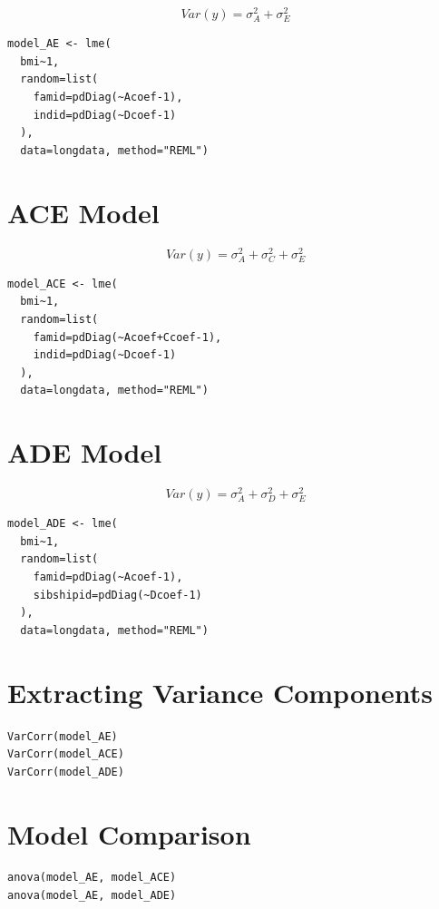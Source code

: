 \documentclass[12pt]{article}
\begin{document}
\[
Var(y)=\sigma_A^2+\sigma_E^2
\]

\begin{verbatim}
model_AE <- lme(
  bmi~1,
  random=list(
    famid=pdDiag(~Acoef-1),
    indid=pdDiag(~Dcoef-1)
  ),
  data=longdata, method="REML")
\end{verbatim}

\section{ACE Model}

\[
Var(y)=\sigma_A^2+\sigma_C^2+\sigma_E^2
\]

\begin{verbatim}
model_ACE <- lme(
  bmi~1,
  random=list(
    famid=pdDiag(~Acoef+Ccoef-1),
    indid=pdDiag(~Dcoef-1)
  ),
  data=longdata, method="REML")
\end{verbatim}

\section{ADE Model}

\[
Var(y)=\sigma_A^2+\sigma_D^2+\sigma_E^2
\]

\begin{verbatim}
model_ADE <- lme(
  bmi~1,
  random=list(
    famid=pdDiag(~Acoef-1),
    sibshipid=pdDiag(~Dcoef-1)
  ),
  data=longdata, method="REML")
\end{verbatim}

\section{Extracting Variance Components}

\begin{verbatim}
VarCorr(model_AE)
VarCorr(model_ACE)
VarCorr(model_ADE)
\end{verbatim}

\section{Model Comparison}

\begin{verbatim}
anova(model_AE, model_ACE)
anova(model_AE, model_ADE)
\end{verbatim}
\end{document}
